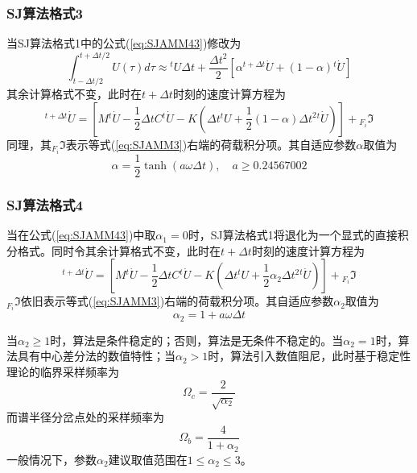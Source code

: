 \subsubsection{SJ算法格式3\cite{Soares2015}}
当SJ算法格式1\cite{SoaresJr2016}中的公式(\ref{eq:SJAMM43})修改为
\begin{equation}
\int_{t-\Delta t/2}^{t+\Delta t/2}{U}(\tau)d\tau\approx{^t\!U}\Delta t+\frac{\Delta t^2}{2}[\alpha{^{t+\Delta t}\!\dot{U}}+(1-\alpha){^{t}\!\dot{U}}]
\end{equation}
其余计算格式不变，此时在$t+\Delta t$时刻的速度计算方程为
\begin{equation}
[M+\frac{1}{2}\Delta tC+\frac{1}{2}\alpha\Delta t^2K]{^{t+\Delta t}\!\dot{U}}=[M{^t\!\dot{U}}-\frac{1}{2}\Delta tC{^t\!\dot{U}}-K(\Delta t{^t\!U}+\frac{1}{2}(1-\alpha)\Delta t^2{^t\!\dot{U}})]+{_{F_i}\!\Im}
\end{equation}
同理，其${_{F_i}\!\Im}$表示等式(\ref{eq:SJAMM3})右端的荷载积分项。其自适应参数$\alpha$取值为
\begin{equation}
\alpha=\frac{1}{2}\tanh(a\omega\Delta t),\quad a\ge0.24567002
\end{equation}

\subsubsection{SJ算法格式4\cite{Soares2014}}
当在公式(\ref{eq:SJAMM43})中取$\alpha_1=0$时，SJ算法格式1\cite{SoaresJr2016}将退化为一个显式的直接积分格式\cite{Soares2014}。同时令其余计算格式不变，此时在$t+\Delta t$时刻的速度计算方程为
\begin{equation}
[M+\frac{1}{2}\Delta tC]{^{t+\Delta t}\!\dot{U}}=[M{^t\!\dot{U}}-\frac{1}{2}\Delta tC{^t\!\dot{U}}-K(\Delta t{^t\!U}+\frac{1}{2}\alpha_2\Delta t^2{^t\!\dot{U}})]+{_{F_i}\!\Im}
\end{equation}
${_{F_i}\!\Im}$依旧表示等式(\ref{eq:SJAMM3})右端的荷载积分项。其自适应参数$\alpha_2$取值为
\begin{equation}
\alpha_2=1+a\omega\Delta t
\end{equation}

当$\alpha_2\ge1$时，算法是条件稳定的；否则，算法是无条件不稳定的。当$\alpha_2=1$时，算法具有中心差分法的数值特性；当$\alpha_2>1$时，算法引入数值阻尼，此时基于稳定性理论的临界采样频率为
\begin{equation}
\Omega_c=\frac{2}{\sqrt{\alpha_2}}
\end{equation}
而谱半径分岔点处的采样频率为
\begin{equation}
\Omega_b=\frac{4}{1+\alpha_2}
\end{equation}
一般情况下，参数$\alpha_2$建议取值范围在$1\le\alpha_2\le3$。

